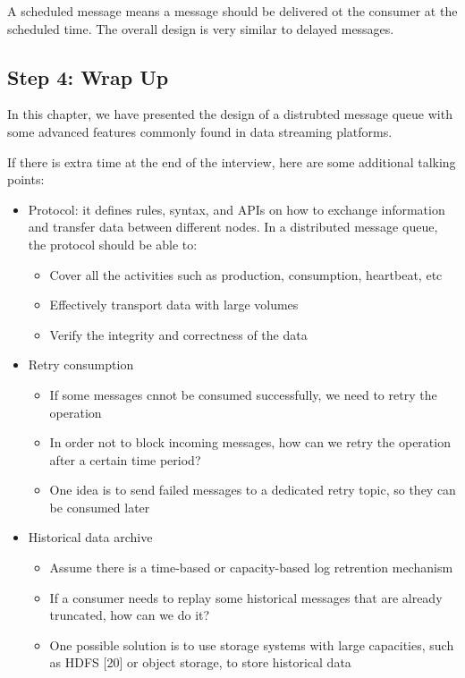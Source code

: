 \documentclass{report}
\theoremstyle{definition}
\let\oldsubsection\subsection
\renewcommand{\subsection}{\oldsubsection*}
\begin{document}
A scheduled message means a message should be delivered ot the consumer at the scheduled time. The overall design is very similar to delayed messages.

\subsection{Step 4: Wrap Up}

In this chapter, we have presented the design of a distrubted message queue with some advanced features commonly found in data streaming platforms.

If there is extra time at the end of the interview, here are some additional talking points:

\begin{itemize}
\item
Protocol: it defines rules, syntax, and APIs on how to exchange information and transfer data between different nodes. In a distributed message queue, the protocol should be able to:

\begin{itemize}
\item
Cover all the activities such as production, consumption, heartbeat, etc
\item
Effectively transport data with large volumes
\item
Verify the integrity and correctness of the data
\end{itemize}
\item
Retry consumption

\begin{itemize}
\item
If some messages cnnot be consumed successfully, we need to retry the operation
\item
In order not to block incoming messages, how can we retry the operation after a certain time period?
\item
One idea is to send failed messages to a dedicated retry topic, so they can be consumed later
\end{itemize}

\item

Historical data archive

\begin{itemize}
\item
Assume there is a time-based or capacity-based log retrention mechanism
\item
If a consumer needs to replay some historical messages that are already truncated, how can we do it?
\item
One possible solution is to use storage systems with large capacities, such as HDFS [20] or object storage, to store historical data
\end{itemize}

\end{itemize}
\end{document}

